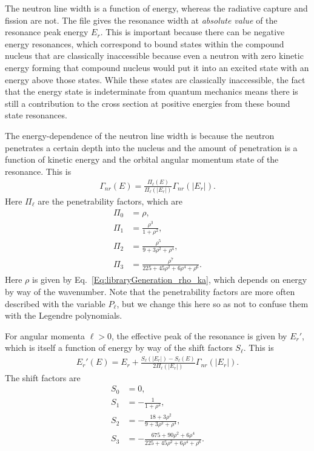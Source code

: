 The neutron line width is a function of energy, whereas the radiative capture and fission are not. The file gives the resonance width at \emph{absolute value} of the resonance peak energy $E_r$. This is important because there can be negative energy resonances, which correspond to bound states within the compound nucleus that are classically inaccessible because even a neutron with zero kinetic energy forming that compound nucleus would put it into an excited state with an energy above those states. While these states are classically inaccessible, the fact that the energy state is indeterminate from quantum mechanics means there is still a contribution to the cross section at positive energies from these bound state resonances.

The energy-dependence of the neutron line width is because the neutron penetrates a certain depth into the nucleus and the amount of penetration is a function of kinetic energy and the orbital angular momentum state of the resonance. This is
\begin{align}
  \Gamma_{nr}(E) = \frac{\Pi_\ell(E)}{\Pi_\ell(|E_r|)} \Gamma_{nr}(|E_r|) .
\end{align}
Here $\Pi_\ell$ are the penetrability factors, which are
\begin{subequations}
\begin{align}
  \Pi_0 &= \rho, \\
  \Pi_1 &= \frac{\rho^3}{1 + \rho^2}, \\
  \Pi_2 &= \frac{\rho^5}{9 + 3\rho^2 + \rho^4}, \\  
  \Pi_3 &= \frac{\rho^7}{225 + 45\rho^2 + 6\rho^4 + \rho^6}.
\end{align}
\end{subequations}
Here $\rho$ is given by Eq.~\eqref{Eq:libraryGeneration_rho_ka}, which depends on energy by way of the wavenumber. Note that the penetrability factors are more often described with the variable $P_\ell$, but we change this here so as not to confuse them with the Legendre polynomials.

For angular momenta $\ell > 0$, the effective peak of the resonance is given by $E_r'$, which is itself a function of energy by way of the shift factors $S_\ell$. This is
\begin{align}
  E_r'(E) = E_r + \frac{ S_\ell(|E_r|) - S_\ell(E) }{ 2 \Pi_\ell(|E_r|) } \Gamma_{nr}(|E_r|).
\end{align}
The shift factors are
\begin{subequations}
\begin{align}
  S_0 &= 0, \\
  S_1 &= -\frac{1}{1 + \rho^2}, \\
  S_2 &= -\frac{18 + 3\rho^2}{9 + 3\rho^2 + \rho^4}, \\  
  S_3 &= -\frac{675 + 90 \rho^2 + 6 \rho^4 }{225 + 45\rho^2 + 6\rho^4 + \rho^6}.
\end{align}
\end{subequations}

